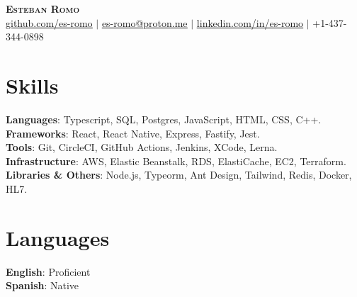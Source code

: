 \documentclass[letterpaper,11pt]{article}
\begin{document}
\begin{center}
    \textbf{\Huge \scshape Esteban Romo} \\ \vspace{1pt}
    \href{https://github.com/es-romo}{\underline{github.com/es-romo}} $|$ 
    \href{mailto:es-romo@proton.me}{\underline{es-romo@proton.me}} $|$ 
    \href{https://www.linkedin.com/in/es-romo/}{\underline{linkedin.com/in/es-romo}} $|$ 
    \small +1-437-344-0898
\end{center}

\begin{minipage}[t]{.78\textwidth}
  \section{Skills}
  \begin{itemize}[leftmargin=0.15in, label={}]
      \small{\item{
      \textbf{Languages}{: Typescript, SQL, Postgres, JavaScript, HTML, CSS, C++.} \\
      \textbf{Frameworks}{: React, React Native, Express, Fastify, Jest.} \\
      \textbf{Tools}{: Git, CircleCI, GitHub Actions, Jenkins, XCode, Lerna.} \\
      \textbf{Infrastructure}{: AWS, Elastic Beanstalk, RDS, ElastiCache, EC2, Terraform.} \\
      \textbf{Libraries \& Others}{: Node.js, Typeorm, Ant Design, Tailwind, Redis, Docker, HL7.} \\
      }}
  \end{itemize}
\end{minipage}\hspace{.02\textwidth}%
\begin{minipage}[t]{.20\textwidth}
  \section{Languages}
  \begin{itemize}[leftmargin=0.0in, label={}]
      \small{\item{
      \textbf{English}{: Proficient} \\
      \textbf{Spanish}{: Native} \\
      }}
  \end{itemize}
\end{minipage}\vspace{-10pt}
\end{document}
